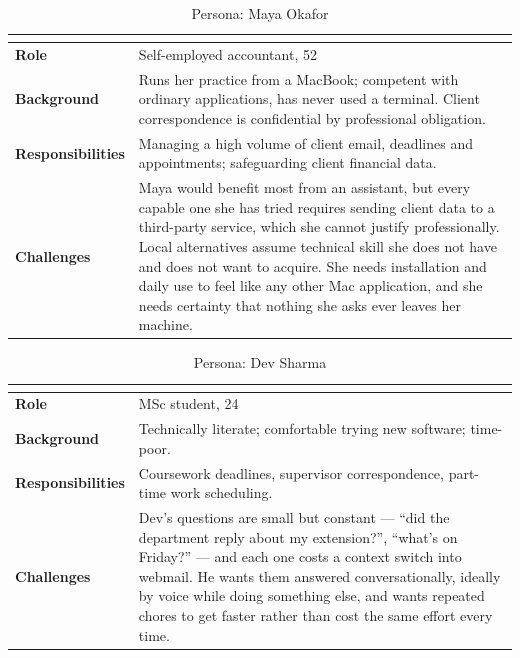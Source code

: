 \documentclass[12pt]{article}
\begin{document}
\begin{table}[htbp]
  \centering
  \caption{Persona: Maya Okafor}
  \label{tab:persona-maya}
  \begin{tabularx}{\textwidth}{@{}>{\bfseries}p{3.4cm}X@{}}
    \toprule
    \multicolumn{2}{@{}l}{\textbf{Maya Okafor}} \\
    \midrule
    Role & Self-employed accountant, 52 \\
    Background & Runs her practice from a MacBook; competent with ordinary
      applications, has never used a terminal. Client correspondence is
      confidential by professional obligation. \\
    Responsibilities & Managing a high volume of client email, deadlines and
      appointments; safeguarding client financial data. \\
    Challenges & Maya would benefit most from an assistant, but every capable
      one she has tried requires sending client data to a third-party
      service, which she cannot justify professionally. Local alternatives
      assume technical skill she does not have and does not want to acquire.
      She needs installation and daily use to feel like any other Mac
      application, and she needs certainty that nothing she asks ever leaves
      her machine. \\
    \bottomrule
  \end{tabularx}
\end{table}

\begin{table}[htbp]
  \centering
  \caption{Persona: Dev Sharma}
  \label{tab:persona-dev}
  \begin{tabularx}{\textwidth}{@{}>{\bfseries}p{3.4cm}X@{}}
    \toprule
    \multicolumn{2}{@{}l}{\textbf{Dev Sharma}} \\
    \midrule
    Role & MSc student, 24 \\
    Background & Technically literate; comfortable trying new software;
      time-poor. \\
    Responsibilities & Coursework deadlines, supervisor correspondence,
      part-time work scheduling. \\
    Challenges & Dev's questions are small but constant --- ``did the
      department reply about my extension?'', ``what's on Friday?'' --- and
      each one costs a context switch into webmail. He wants them answered
      conversationally, ideally by voice while doing something else, and
      wants repeated chores to get faster rather than cost the same effort
      every time. \\
    \bottomrule
  \end{tabularx}
\end{table}
\end{document}
